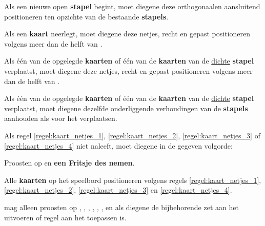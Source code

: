 
\vervolgLijst{}
\item Als \eenSpeler een nieuwe \ul{open} \textbf{stapel} begint, moet diegene deze orthogonaal\footnotemark[2] en aansluitend positioneren ten opzichte van de bestaande \textbf{stapels}.
\label{regel:kaart_netjes_1}
\eindLijst{}

\vervolgLijst{}
\item Als \eenSpeler een \textbf{kaart} neerlegt, moet diegene deze netjes, recht en gepast positioneren volgens meer dan de helft van \alleSpelersN.
\label{regel:kaart_netjes_2}
\eindLijst{}

\vervolgLijst{}
\item Als \eenSpeler één van de opgelegde \textbf{kaarten} of één van de \textbf{kaarten} van de \ul{dichte} \textbf{stapel} verplaatst, moet diegene deze netjes, recht en gepast positioneren volgens meer dan de helft van \alleSpelersN.
\label{regel:kaart_netjes_3}
\eindLijst{}

\vervolgLijst{}
\item Als \eenSpeler één van de opgelegde \textbf{kaarten} of één van de \textbf{kaarten} van de \ul{dichte} \textbf{stapel} verplaatst, moet diegene dezelfde onderliggende verhoudingen van de \textbf{stapels} aanhouden als voor het verplaatsen.
\label{regel:kaart_netjes_4}
\eindLijst{}

\vervolgLijst{}
\item Als \eenSpeler regel \ref{regel:kaart_netjes_1}, \ref{regel:kaart_netjes_2}, \ref{regel:kaart_netjes_3} of \ref{regel:kaart_netjes_4} niet naleeft, moet diegene in de gegeven volgorde:
\puntLijst{}
\item Proosten op  en \textbf{een Fritsje des nemen}\footnotemark[3].
\item Alle \textbf{kaarten} op het speelbord positioneren volgens regels \ref{regel:kaart_netjes_1}, \ref{regel:kaart_netjes_2}, \ref{regel:kaart_netjes_3} en \ref{regel:kaart_netjes_4}.
\eindPuntLijst{}
\label{regel:kaart_netjes_terugleggen}
\eindLijst{}


\vervolgLijst{}
\item \EenSpeler mag alleen proosten op , , , , , ,  en  als diegene de bijbehorende zet aan het uitvoeren of regel aan het toepassen is\footnotemark[4].
\eindLijst{}

